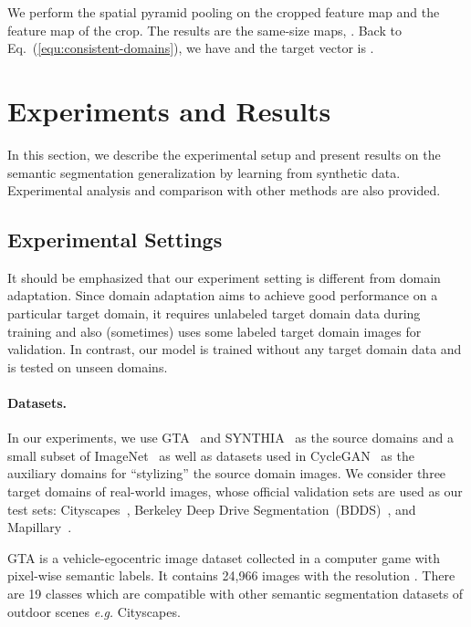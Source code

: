 \documentclass[10pt,twocolumn,letterpaper]{article}
\newcommand{\eat}[1]{}
\begin{document}
We perform the spatial pyramid pooling on the cropped feature map  and the feature map  of the crop. The results are the same-size maps, . Back to Eq.~(\ref{equ:consistent-domains}), we have  and the target vector is .

\eat{
we can get the  for the pyramid consistency between random crops and full images:

}


\section{Experiments and Results}
\label{sec:experiments_and_results}
In this section, we describe the experimental setup and present  results on the semantic
segmentation generalization by learning from
synthetic data. Experimental analysis and comparison with
other methods are also provided.

\subsection{Experimental Settings}
It should be emphasized that our experiment setting is different from domain adaptation. Since domain adaptation aims to achieve good performance on a particular target domain, it requires unlabeled target domain data during training and also (sometimes) uses some labeled target domain images for validation. In contrast, our model is trained without any target domain data and is tested on unseen domains. 
\vspace{-8mm}
\paragraph{Datasets.}
In our experiments, we use GTA~\cite{richter2016playingfordata} and SYNTHIA~\cite{ros2016synthia} as the source domains and a small subset of ImageNet~\cite{deng2009imagenet} as well as datasets used in CycleGAN~\cite{CycleGAN2017} as the auxiliary domains for ``stylizing'' the source domain images. We consider three target domains of real-world images, whose official validation sets are used as our test sets:  Cityscapes~\cite{cordts2016cityscapes}, Berkeley Deep Drive Segmentation~(BDDS)~\cite{yu2018bdd100k}, and Mapillary~\cite{neuhold2017mapillary}.

GTA is a vehicle-egocentric image dataset collected in a computer game with pixel-wise semantic labels. It contains 24,966 images with the resolution . There are 19 classes which are compatible with other semantic segmentation datasets of outdoor scenes \textit{e.g.} Cityscapes. 
\end{document}
